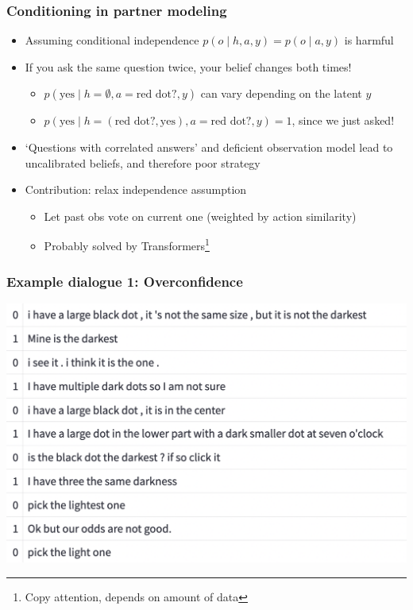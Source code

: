 \documentclass{beamer}
\begin{document}
\begin{frame}
\frametitle{Conditioning in partner modeling}
\begin{itemize}
\item Assuming conditional independence $p(o \mid h, a, y) = p(o \mid a, y)$ is harmful
\item If you ask the same question twice, your belief changes both times!
    \begin{itemize}
    \item $p(\text{yes} \mid h = \emptyset, a=\text{red dot?},y)$ can vary depending on the latent $y$
    \item $p(\text{yes} \mid h = (\text{red dot?}, \text{yes}), a = \text{red dot?},y) = 1$,
        since we just asked!
    \end{itemize}
\item `Questions with correlated answers' and deficient observation model
    lead to uncalibrated beliefs, and therefore poor strategy
\item Contribution: relax independence assumption
    \begin{itemize}
    \item Let past obs vote on current one (weighted by action similarity)
    \item Probably solved by Transformers\footnote{Copy attention,
        depends on amount of data}
    \end{itemize}
\end{itemize}
\end{frame}

\begin{frame}
\frametitle{Example dialogue 1: Overconfidence}
\centering
\includegraphics[width=\textwidth]{img/words1.png}
\end{frame}
\end{document}
